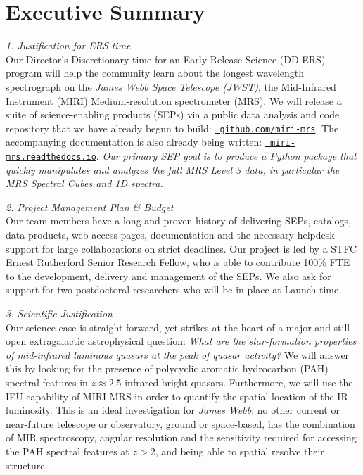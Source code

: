 \vspace{-4pt}
\section*{{\sc Executive Summary}}

\vspace{-6pt}
\noindent
{\it 1. Justification for ERS time}\\
Our Director’s Discretionary time for an Early Release Science
(DD-ERS) program will help the community learn about the longest
wavelength spectrograph on the {\it James Webb Space Telescope (JWST)},
the Mid-Infrared Instrument (MIRI) Medium-resolution spectrometer
(MRS).  We will release a suite of science-enabling products (SEPs)
via a public data analysis and code repository that we have already
begun to build: \href{https://github.com/miri-mrs}{\tt
github.com/miri-mrs}.  The accompanying documentation is also already
being written: \href{http://miri-mrs.readthedocs.io/}{{\tt
miri-mrs.readthedocs.io}}.  {\it Our primary SEP goal is to produce a
Python package that quickly manipulates and analyzes the full MRS
Level 3 data, in particular the MRS Spectral Cubes and 1D spectra. }

\smallskip 
\smallskip \smallskip
\noindent
{\it 2. Project Management Plan \& Budget} \\
Our team members have a long and proven history of delivering SEPs, 
catalogs, data products, web access pages, documentation and the
necessary helpdesk support for large collaborations on strict
deadlines.  Our project is led by a STFC Ernest Rutherford Senior
Research Fellow, who is able to contribute 100\% FTE to the
development, delivery and management of the SEPs.  We also ask for
support for two postdoctoral researchers who will be in place at
Launch time.

\smallskip 
\smallskip \smallskip
\noindent
{\it 3. Scientific Justification}\\
Our science case is straight-forward, yet strikes at the heart of a
major and still open extragalactic astrophysical question: {\it What
are the star-formation properties of mid-infrared luminous quasars at
the peak of quasar activity? } We will answer this by looking for the
presence of polycyclic aromatic hydrocarbon (PAH) spectral features in
$z\approx2.5$ infrared bright quasars.  Furthermore, we will use
the IFU capability of MIRI MRS in order to quantify the spatial
location of the IR luminosity. This is an ideal investigation for
{\it James Webb}; no other current or near-future telescope or
observatory, ground or space-based, has the combination of MIR
spectroscopy, angular resolution and the sensitivity required for
accessing the PAH spectral features at $z>2$, and being able to
spatial resolve their structure.


